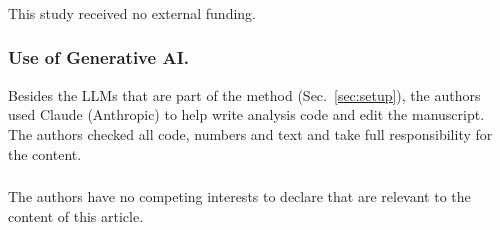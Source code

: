 \documentclass[runningheads]{llncs}
\begin{document}
\begin{credits}
\subsubsection{\ackname} This study received no external funding.

\subsubsection{Use of Generative AI.} Besides the LLMs that are part of the method (Sec.~\ref{sec:setup}), the authors used Claude (Anthropic) to help write analysis code and edit the manuscript. The authors checked all code, numbers and text and take full responsibility for the content.

\subsubsection{\discintname}
The authors have no competing interests to declare that are relevant to the content of this article.
\end{credits}



\end{document}
